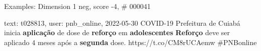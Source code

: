 \begin{frame}{Examples: Dimension 1 neg, score -4, \# 000041}
\footnotesize
\begin{alertblock}{text: t028813, user: pnb\_online, 2022-05-30}
COVID-19 Prefeitura de Cuiabá inicia \textbf{aplicação} de dose de 
\textbf{reforço} em \textbf{adolescentes} \textbf{Reforço} deve ser aplicado 4 
meses após a \textbf{segunda} dose. https://t.co/CM8rUCAemw \#PNBonline 
\end{alertblock}
\end{frame}

